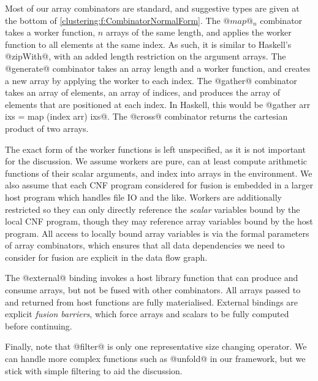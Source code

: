 Most of our array combinators are standard, and suggestive types are given at the bottom of \cref{clustering:f:CombinatorNormalForm}. The $@map@_n$ combinator takes a worker function, $n$ arrays of the same length, and applies the worker function to all elements at the same index. As such, it is similar to Haskell's @zipWith@, with an added length restriction on the argument arrays. The @generate@ combinator takes an array length and a worker function, and creates a new array by applying the worker to each index. The @gather@ combinator takes an array of elements, an array of indices, and produces the array of elements that are positioned at each index. In Haskell, this would be @gather arr ixs = map (index arr) ixs@. The @cross@ combinator returns the cartesian product of two arrays. 

The exact form of the worker functions is left unspecified, as it is not important for the discussion. We assume workers are pure, can at least compute arithmetic functions of their scalar arguments, and index into arrays in the environment. We also assume that each CNF program considered for fusion is embedded in a larger host program which handles file IO and the like. Workers are additionally restricted so they can only directly reference the \emph{scalar} variables bound by the local CNF program, though they may reference array variables bound by the host program. All access to locally bound array variables is via the formal parameters of array combinators, which ensures that all data dependencies we need to consider for fusion are explicit in the data flow graph.

The @external@ binding invokes a host library function that can produce and consume arrays, but not be fused with other combinators. All arrays passed to and returned from host functions are fully materialised. External bindings are explicit \emph{fusion barriers}, which force arrays and scalars to be fully computed before continuing. 

Finally, note that @filter@ is only one representative size changing operator. We can handle more complex functions such as @unfold@ in our framework, but we stick with simple filtering to aid the discussion.




